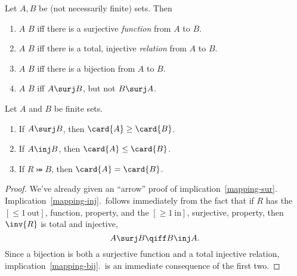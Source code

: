 \begin{definition}\label{bigger}
  Let $A,B$ be (not necessarily finite) sets.  Then
  \begin{enumerate}
  \item $A$ \term{$\surj$} $B$ iff there is a surjective \emph{function} from $A$ to $B$.  

  \item $A$ \term{$\inj$} $B$ iff there is a total, injective \emph{relation} from $A$ to $B$.

  \item $A$ \term{$\bij$} $B$ iff there is a bijection from $A$ to $B$.  

  \item $A$ \term{$\strict$} $B$ iff $A \surj B$, but not $B \surj A$.

  \end{enumerate}
\end{definition}

\begin{lemma}\label{maprule_implies}
Let $A$ and $B$ be finite sets.

\begin{enumerate}

\item\label{mapping-sur} If $A \surj B$, then $\card{A} \geq \card{B}$.

\item\label{mapping-inj} If $A \inj B$, then $\card{A} \leq \card{B}$.

\item\label{mapping-bij} If $R \bij B$, then $\card{A} = \card{B}$.
\end{enumerate}

\end{lemma}

\begin{proof}
  We've already given an ``arrow'' proof of implication~\ref{mapping-sur}.
  Implication~\ref{mapping-inj}.\ follows immediately from the fact that
  if $R$ has the $[\le 1\ \text{out}]$, function, property, and the $[\ge 1\
  \text{in}]$, surjective, property, then $\inv{R}$ is total and injective,
\[  
A \surj B \qiff B \inj A.
\]
  Since a bijection is both a surjective function and a total
  injective relation, implication~\ref{mapping-bij}.\ is an immediate
  consequence of the first two.
\end{proof}

